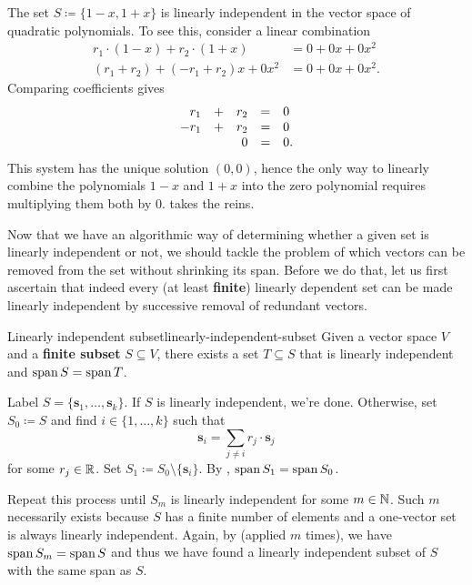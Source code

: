 \begin{example}{}{}
 The set $S \coloneqq \{1-x,1+x\}$ is linearly independent in the vector space
 of quadratic polynomials. To see this, consider a linear combination
 \begin{align*}
  r_1 \cdot (1-x) + r_2 \cdot (1+x) &= 0 + 0x + 0x^2\\
  (r_1 + r_2) + (-r_1 + r_2)x + 0x^2 &= 0 + 0x + 0x^2.
 \end{align*}
 Comparing coefficients gives
 \[
  \begin{array}{r c r c l}
   r_1 & + & r_2 & = & 0\\
   -r_1 & + & r_2 & = & 0\\
        & & 0 & = & 0.
  \end{array}
 \]
 This system has the unique solution $(0,0)$, hence the only way to linearly
 combine the polynomials $1-x$ and $1+x$ into the zero polynomial requires
 multiplying them both by $0$.
  takes the reins.
\end{example}

Now that we have an algorithmic way of determining whether a given set is
linearly independent or not, we should tackle the problem of which vectors can
be removed from the set without shrinking its span. Before we do that, let us
first ascertain that indeed every (at least \textbf{finite}) linearly dependent
set can be made linearly independent by successive removal of redundant vectors.

\begin{lemma}{Linearly independent subset}{linearly-independent-subset}
 Given a vector space $V$ and a \textbf{finite subset} $S \subseteq V$, there
 exists a set $T \subseteq S$ that is linearly independent and $\operatorname{span} S = \operatorname{span}
 T$.
\end{lemma}
\begin{lemproof}
 Label $S = \{\mathbf{s}_1,\ldots,\mathbf{s}_k\}$. If $S$ is linearly
 independent, we're done. Otherwise, set $S_0 \coloneqq S$ and find $i \in
 \{1,\ldots,k\}$ such that
 \[
  \mathbf{s}_i = \sum_{j \neq i} r_j \cdot \mathbf{s}_j
 \]
 for some $r_j \in \mathbb{R}$. Set $S_1 \coloneqq S_0 \setminus \{\mathbf{s}_i\}$. By
 , $\operatorname{span} S_1 = \operatorname{span} S_0$.

 Repeat this process until $S_m$ is linearly independent for some $m \in \mathbb{N}$.
 Such $m$ necessarily exists because $S$ has a finite number of elements and a
 one-vector set is always linearly independent. Again, by
  (applied $m$ times), we have $\operatorname{span} S_m =
 \operatorname{span} S$ and thus we have found a linearly independent subset of $S$ with the
 same span as $S$.
\end{lemproof}

